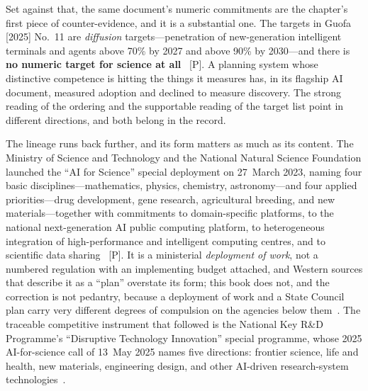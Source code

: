 Set against that, the same document's numeric commitments are the chapter's first piece of counter-evidence, and it is a substantial one. The targets in Guofa [2025] No.~11 are \emph{diffusion} targets---penetration of new-generation intelligent terminals and agents above 70\% by 2027 and above 90\% by 2030---and there is \textbf{no numeric target for science at all}~\cite{ai-plus-science} [P]. A planning system whose distinctive competence is hitting the things it measures has, in its flagship AI document, measured adoption and declined to measure discovery. The strong reading of the ordering and the supportable reading of the target list point in different directions, and both belong in the record.

The lineage runs back further, and its form matters as much as its content. The Ministry of Science and Technology and the National Natural Science Foundation launched the ``AI for Science'' special deployment on 27~March 2023, naming four basic disciplines---mathematics, physics, chemistry, astronomy---and four applied priorities---drug development, gene research, agricultural breeding, and new materials---together with commitments to domain-specific platforms, to the national next-generation AI public computing platform, to heterogeneous integration of high-performance and intelligent computing centres, and to scientific data sharing~\cite{most-ai4s} [P]. It is a ministerial \emph{deployment of work}, not a numbered regulation with an implementing budget attached, and Western sources that describe it as a ``plan'' overstate its form; this book does not, and the correction is not pedantry, because a deployment of work and a State Council plan carry very different degrees of compulsion on the agencies below them~\cite{china-ai4s}. The traceable competitive instrument that followed is the National Key R\&D Programme's ``Disruptive Technology Innovation'' special programme, whose 2025 AI-for-science call of 13~May 2025 names five directions: frontier science, life and health, new materials, engineering design, and other AI-driven research-system technologies~\cite{most-ai4s}.


